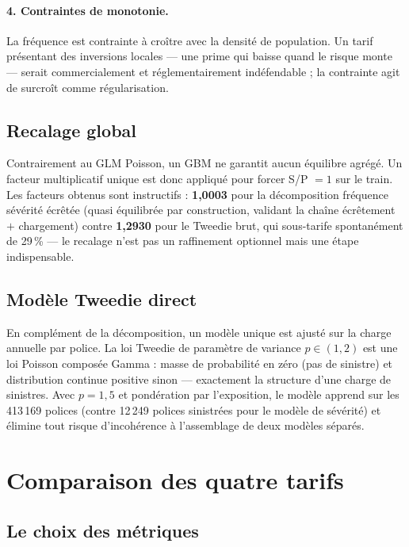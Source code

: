 \documentclass[11pt,a4paper]{article}
\begin{document}
\paragraph{4. Contraintes de monotonie.} La fréquence est contrainte à croître avec la densité de population. Un tarif présentant des inversions locales --- une prime qui baisse quand le risque monte --- serait commercialement et réglementairement indéfendable ; la contrainte agit de surcroît comme régularisation.

\subsection{Recalage global}

Contrairement au GLM Poisson, un GBM ne garantit aucun équilibre agrégé. Un facteur multiplicatif unique est donc appliqué pour forcer S/P $= 1$ sur le train. Les facteurs obtenus sont instructifs : \textbf{1{,}0003} pour la décomposition fréquence \texttimes{} sévérité écrêtée (quasi équilibrée par construction, validant la chaîne écrêtement $+$ chargement) contre \textbf{1{,}2930} pour le Tweedie brut, qui sous-tarife spontanément de 29\,\% --- le recalage n'est pas un raffinement optionnel mais une étape indispensable.

\subsection{Modèle Tweedie direct}

En complément de la décomposition, un modèle unique est ajusté sur la charge annuelle par police. La loi Tweedie de paramètre de variance $p \in (1, 2)$ est une loi Poisson composée Gamma : masse de probabilité en zéro (pas de sinistre) et distribution continue positive sinon --- exactement la structure d'une charge de sinistres. Avec $p = 1{,}5$ et pondération par l'exposition, le modèle apprend sur les 413\,169 polices (contre 12\,249 polices sinistrées pour le modèle de sévérité) et élimine tout risque d'incohérence à l'assemblage de deux modèles séparés.

\section{Comparaison des quatre tarifs}
\label{sec:compare}

\subsection{Le choix des métriques}
\end{document}
